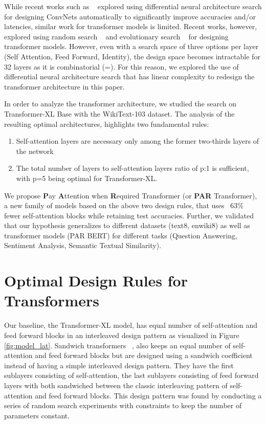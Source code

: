 \documentclass[11pt]{article}
\begin{document}
While recent works such as ~\citep{fbnet,fbnet2,darts} explored using differential neural architecture search for designing ConvNets automatically to significantly improve accuracies and/or latencies, similar work for transformer models is limited. Recent works, however, explored using random search ~\citep{SandwichTransformer} and evolutionary search ~\citep{hwawaretrans,evolvedtrans} for designing transformer models. However, even with a search space of three options per layer (Self Attention, Feed Forward, Identity), the design space becomes intractable for 32 layers as it is combinatorial (=). For this reason, we explored the use of differential neural architecture search that has linear complexity to redesign the transformer architecture in this paper.

In order to analyze the transformer architecture, we studied the search on Transformer-XL Base with the WikiText-103 dataset. The analysis of the resulting optimal architectures, highlights two fundamental rules:

\begin{enumerate}
    \item Self-attention layers are necessary only among the former two-thirds layers of the network
    \item The total number of layers to self-attention layers ratio of p:1 is sufficient, with p=5 being optimal for Transformer-XL.
\end{enumerate}

We propose \textbf{P}ay \textbf{A}ttention when \textbf{R}equired Transformer (or \textbf{PAR} Transformer), a new family of models based on the above two design rules, that uses ~63\% fewer self-attention blocks while retaining test accuracies. Further, we validated that our hypothesis generalizes to different datasets (text8, enwiki8) as well as transformer models (PAR BERT) for different tasks (Question Answering, Sentiment Analysis, Semantic Textual Similarity).

\section{Optimal Design Rules for Transformers}

Our baseline, the Transformer-XL model, has equal number of self-attention and feed forward blocks in an interleaved design pattern as visualized in Figure \ref{fig:model_lat}. Sandwich transformers ~\citep{SandwichTransformer}, also keeps an equal number of self-attention and feed forward blocks but are designed using a sandwich coefficient  instead of having a simple interleaved design pattern. They have the first  sublayers consisting of self-attention, the last  sublayers consisting of feed forward layers with both sandwiched between the classic interleaving pattern of self-attention and feed forward blocks. This design pattern was found by conducting a series of random search experiments with constraints to keep the number of parameters constant. 
\end{document}
